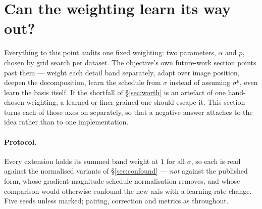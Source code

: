 \section{Can the weighting learn its way out?}
\label{sec:extensions}

Everything to this point audits one fixed weighting: two parameters,
$\alpha$ and $p$, chosen by grid search per dataset. The objective's own
future-work section points past them --- weight each detail band separately,
adapt over image position, deepen the decomposition, learn the schedule from
$\sigma$ instead of assuming $\sigma^{p}$, even learn the basis itself. If the
shortfall of \S\ref{sec:worth} is an artefact of one hand-chosen weighting, a
learned or finer-grained one should escape it. This section turns each of
those axes on separately, so that a negative answer attaches to the idea
rather than to one implementation.

\paragraph{Protocol.} Every extension holds its summed band weight at $1$ for
all $\sigma$, so each is read against the normalised variants of
\S\ref{sec:confound} --- \emph{not} against the published form, whose
gradient-magnitude schedule normalisation removes, and whose comparison would
otherwise confound the new axis with a learning-rate change. Five seeds unless
marked; pairing, correction and metrics as throughout.

